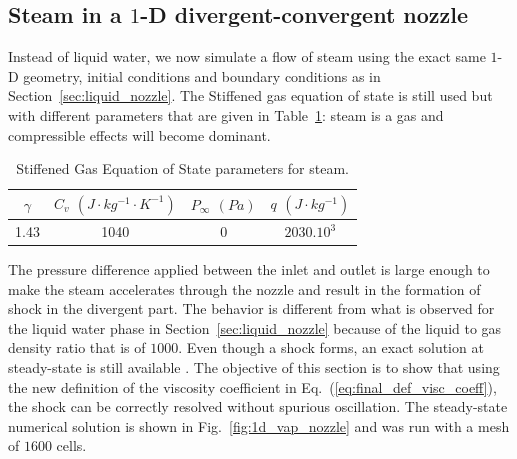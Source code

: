 \documentclass[preprint,10pt]{elsarticle}
\newcommand{\eqt}[1]{Eq.~(\ref{#1})}                     %
\newcommand{\fig}[1]{Fig.~\ref{#1}}                      %
\newcommand{\tbl}[1]{Table~\ref{#1}}                     %
\newcommand{\sct}[1]{Section~\ref{#1}}                   %
\begin{document}
\subsection{Steam in a $1$-D divergent-convergent nozzle} \label{sec:steam_nozzle}
Instead of liquid water, we now simulate a flow of steam using the exact same $1$-D geometry, initial conditions and boundary conditions as in \sct{sec:liquid_nozzle}. The Stiffened gas equation of state is still used but with different parameters that are given in \tbl{tbl:stff_gas_eos_vap}: steam is a gas and compressible effects will become dominant. 
\begin{table}[H]
\begin{center}
 \caption{\label{tbl:stff_gas_eos_vap} Stiffened Gas Equation of State parameters for steam.}
 \begin{tabular}{|c|c|c|c|}
 \hline
$\gamma$ & $C_v$ $(J\cdot kg^{-1} \cdot K^{-1})$ & $P_\infty$ $(Pa)$ & $q$ $(J \cdot kg^{-1})$ \\
 \hline
1.43 & 1040 & 0 & $2030.10^3$   \\
 \hline
\end{tabular}
\end{center}
\end{table}
The pressure difference applied between the inlet and outlet is large enough to make the steam accelerates through the nozzle and result in the formation of shock in the divergent part. The behavior is different from what is observed for the liquid water phase in \sct{sec:liquid_nozzle} because of the liquid to gas density ratio that is of $1000$. Even though a shock forms, an exact solution at steady-state is still available \cite{nozzle_exact}. The objective of this section is to show that using the new definition of the viscosity coefficient in \eqt{eq:final_def_visc_coeff}, the shock can be correctly resolved without spurious oscillation. The steady-state numerical solution is shown in \fig{fig:1d_vap_nozzle} and was run with a mesh of $1600$ cells.
\end{document}
